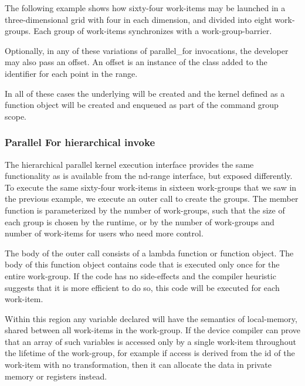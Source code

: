 The following example shows how sixty-four work-items may be launched
in a three-dimensional grid with four in each dimension, and divided
into eight work-groups. Each group of work-items synchronizes with a
\gls{work-group-barrier}.



Optionally, in any of these variations of parallel_for invocations,
the developer may also pass an offset. An offset is an
instance of the  class added to the identifier 
for each point in the range.

In all of these cases the underlying  will be created
and the kernel defined as a function object will be created and enqueued
as part of the command group scope.


\subsubsection{Parallel For hierarchical invoke}

The hierarchical parallel kernel execution interface provides the same
functionality as is available from the \gls{nd-range} interface, but
exposed differently. To execute the same sixty-four work-items in
sixteen work-groups that we saw in the previous example, we execute an
outer  call to create the
groups. The member function
 is parameterized by the
number of work-groups, such that the size of each group is chosen by
the runtime, or by the number of work-groups and number of work-items
for users who need more control.

The body of the outer  call
consists of a lambda function or function object. The body of this
function object contains code that is executed only once for the
entire work-group. If the code has no side-effects and the compiler
heuristic suggests that it is more efficient to do so, this code will be
executed for each work-item.

Within this region any variable declared will have the semantics of
\gls{local-memory}, shared between all \glspl{work-item} in the 
\gls{work-group}. If the
device compiler can prove that an array of such variables is accessed only by
a single work-item throughout the lifetime of the work-group, for
example if access is derived from the id of the work-item with no
transformation, then it can allocate the data in private memory or
registers instead.

